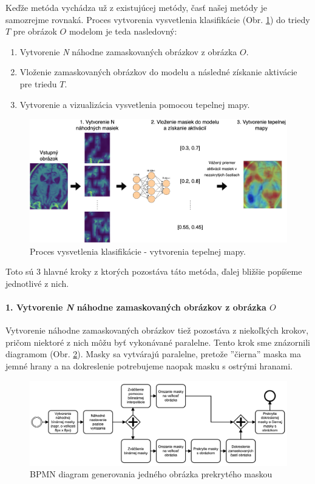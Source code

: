 Keďže metóda vychádza už z existujúcej metódy, časť našej metódy je samozrejme rovnaká. Proces vytvorenia vysvetlenia klasifikácie (Obr. \ref{fig:risei_heatmap_generation}) do triedy $T$ pre obrázok $O$ modelom je teda nasledovný:

\begin{enumerate}
    \item Vytvorenie \textit{N} náhodne zamaskovaných obrázkov z obrázka $O$.
    \item Vloženie zamaskovaných obrázkov do modelu a následné získanie aktivácie pre triedu $T$.
    \item Vytvorenie a vizualizácia vysvetlenia pomocou tepelnej mapy.
\end{enumerate}

\begin{figure}[h!]
    \centering
    \includegraphics[scale=0.35]{assets/images/risei_heatmap_generation.png}
    \caption{Proces vysvetlenia klasifikácie - vytvorenia tepelnej mapy.}
    \label{fig:risei_heatmap_generation}
\end{figure}

Toto sú 3 hlavné kroky z ktorých pozostáva táto metóda, ďalej bližšie popíšeme jednotlivé z nich.

\paragraph{1. Vytvorenie \textit{N} náhodne zamaskovaných obrázkov z obrázka $O$}

Vytvorenie náhodne zamaskovaných obrázkov tiež pozostáva z niekoľkých krokov, pričom niektoré z nich môžu byť vykonávané paralelne. Tento krok sme znázornili diagramom (Obr. \ref{fig:risei_diagram}). Masky sa vytvárajú paralelne, pretože ''čierna'' maska ma jemné hrany a na dokreslenie potrebujeme naopak masku s ostrými hranami.

\begin{figure}[h!]
    \centering
    \includegraphics[scale=0.45]{assets/images/risei_diagram.png}
    \caption{BPMN diagram generovania jedného obrázka prekrytého maskou}
    \label{fig:risei_diagram}
\end{figure}

